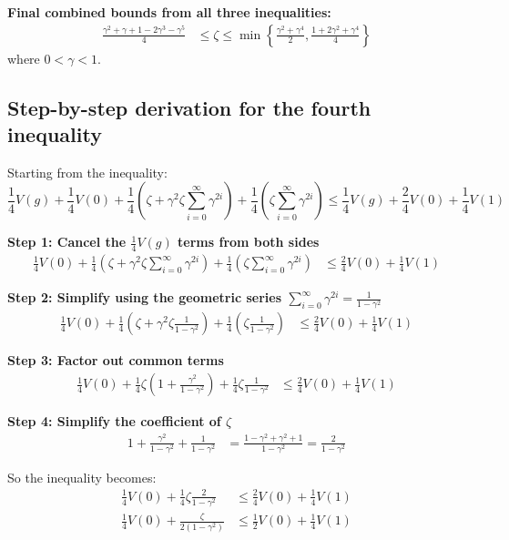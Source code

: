 \textbf{Final combined bounds from all three inequalities:}
\begin{align}
\frac{\gamma^2 + \gamma + 1 - 2\gamma^3 - \gamma^5}{4} &\leq \zeta \leq \min\left\{\frac{\gamma^2 + \gamma^4}{2}, \frac{1 + 2\gamma^2 + \gamma^4}{4}\right\}
\end{align}
where $0 < \gamma < 1$.

\subsection{Step-by-step derivation for the fourth inequality}

Starting from the inequality:
$$\frac{1}{4}V(g) + \frac{1}{4}V(0) + \frac{1}{4}(\zeta+\gamma^{2}\zeta\sum_{i=0}^\infty\gamma^{2i}) + \frac{1}{4}(\zeta\sum_{i=0}^\infty\gamma^{2i}) \leq \frac{1}{4}V(g) + \frac{2}{4}V(0) + \frac{1}{4}V(1)$$

\textbf{Step 1: Cancel the $\frac{1}{4}V(g)$ terms from both sides}
\begin{align}
\frac{1}{4}V(0) + \frac{1}{4}(\zeta+\gamma^{2}\zeta\sum_{i=0}^\infty\gamma^{2i}) + \frac{1}{4}(\zeta\sum_{i=0}^\infty\gamma^{2i}) &\leq \frac{2}{4}V(0) + \frac{1}{4}V(1)
\end{align}

\textbf{Step 2: Simplify using the geometric series $\sum_{i=0}^\infty\gamma^{2i} = \frac{1}{1-\gamma^2}$}
\begin{align}
\frac{1}{4}V(0) + \frac{1}{4}\left(\zeta+\gamma^{2}\zeta\frac{1}{1-\gamma^2}\right) + \frac{1}{4}\left(\zeta\frac{1}{1-\gamma^2}\right) &\leq \frac{2}{4}V(0) + \frac{1}{4}V(1)
\end{align}

\textbf{Step 3: Factor out common terms}
\begin{align}
\frac{1}{4}V(0) + \frac{1}{4}\zeta\left(1+\frac{\gamma^{2}}{1-\gamma^2}\right) + \frac{1}{4}\zeta\frac{1}{1-\gamma^2} &\leq \frac{2}{4}V(0) + \frac{1}{4}V(1)
\end{align}

\textbf{Step 4: Simplify the coefficient of $\zeta$}
\begin{align}
1+\frac{\gamma^{2}}{1-\gamma^2} + \frac{1}{1-\gamma^2} &= \frac{1-\gamma^2 + \gamma^2 + 1}{1-\gamma^2} = \frac{2}{1-\gamma^2}
\end{align}

So the inequality becomes:
\begin{align}
\frac{1}{4}V(0) + \frac{1}{4}\zeta\frac{2}{1-\gamma^2} &\leq \frac{2}{4}V(0) + \frac{1}{4}V(1)\\
\frac{1}{4}V(0) + \frac{\zeta}{2(1-\gamma^2)} &\leq \frac{1}{2}V(0) + \frac{1}{4}V(1)
\end{align}

